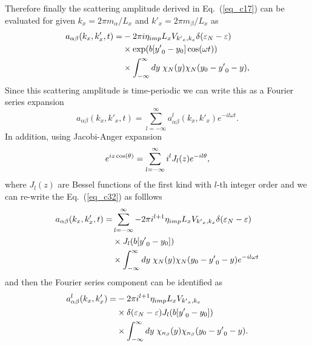 Therefore finally the scattering amplitude derived in Eq.~(\ref{eq_c17}) can be evaluated for given $k_x = 2\pi m_{\alpha}/L_x$ and $k'_x =  2\pi m_{\beta}/L_x$ as
\begin{equation} \label{eq_c32}
  \begin{aligned}
    a_{\alpha\beta}(k_x,k'_x,t)  =&
    -2\pi i
    \eta_{imp} L_x V_{{k'}_x,k_x}
    \delta(\varepsilon_{N} - \varepsilon)\\
    & \times
    \exp(b[{y'}_0 - y_0]\cos(\omega t))\\
    & \times
    \int_{-\infty}^{\infty} dy \;
    {\chi}_{N}\qty(y)
    {\chi}_{N}\qty(y_0 - {y'}_0 - y),
  \end{aligned}
\end{equation}
Since this scattering amplitude is time-periodic we can write this as a Fourier series expansion
\begin{equation} \label{eq_c33}
    a_{\alpha\beta}(k_x,k'_x,t) =
    \sum_{l=-\infty}^{\infty} a^l_{\alpha\beta}(k_x,k'_x) e^{-il\omega t}.
\end{equation}
In addition, using Jacobi-Anger expansion \cite{cuyt08,abramowitz64}
\begin{equation} \label{eq_c34}
    e^{iz\cos(\theta)} = \sum_{l=-\infty}^{\infty} i^l J_l\qty(z) e^{-il\theta},
\end{equation}
where $J_l(z)$ are Bessel functions of the first kind with $l$-th integer order and we can re-write the Eq.~(\ref{eq_c32}) as folllows
\begin{equation} \label{eq_c35}
  \begin{aligned}
    a_{\alpha\beta}(k_x,k'_x,t)  = &
    \sum_{l=-\infty}^{\infty}
    -2\pi i^{l+1}
    \eta_{imp} L_x V_{{k'}_x,k_x}
    \delta(\varepsilon_{N} - \varepsilon)\\
    & \times
    J_l\qty(b[{y'}_0 - y_0]) \\
    & \times
    \int_{-\infty}^{\infty} dy \;
    {\chi}_{N}\qty(y)
    {\chi}_{N}\qty(y_0 - {y'}_0 - y) e^{-il\omega t}
  \end{aligned}
\end{equation}
and then the Fourier series component can be identified as
\begin{equation} \label{eq_c36}
  \begin{aligned}
    a^l_{\alpha\beta}(k_x,k'_x) = &
    -2\pi i^{l+1}
    \eta_{imp} L_x V_{{k'}_x,k_x}\\
    & \times
    \delta(\varepsilon_{N} - \varepsilon)
    J_l\qty(b[{y'}_0 - y_0])\\
    & \times
    \int_{-\infty}^{\infty} dy \;
    {\chi}_{n_{\beta}}\qty(y)
    {\chi}_{n_{\beta}}\qty(y_0 - {y'}_0 - y).
  \end{aligned}
\end{equation}
